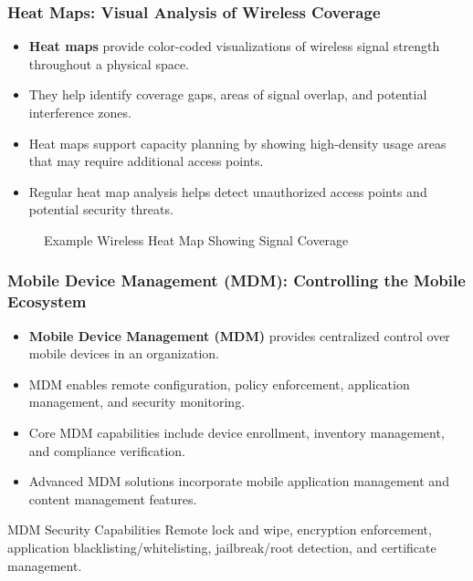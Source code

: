\documentclass{beamer}
\begin{document}
\begin{frame}
    \frametitle{Heat Maps: Visual Analysis of Wireless Coverage}
    
    \begin{itemize}
        \item \textbf{Heat maps} provide color-coded visualizations of wireless signal strength throughout a physical space.
        \item They help identify coverage gaps, areas of signal overlap, and potential interference zones.
        \item Heat maps support capacity planning by showing high-density usage areas that may require additional access points.
        \item Regular heat map analysis helps detect unauthorized access points and potential security threats.
    \end{itemize}
    
    \begin{figure}
        \centering
        \caption{Example Wireless Heat Map Showing Signal Coverage}
    \end{figure}
\end{frame}

\begin{frame}
    \frametitle{Mobile Device Management (MDM): Controlling the Mobile Ecosystem}
    
    \begin{itemize}
        \item \textbf{Mobile Device Management (MDM)} provides centralized control over mobile devices in an organization.
        \item MDM enables remote configuration, policy enforcement, application management, and security monitoring.
        \item Core MDM capabilities include device enrollment, inventory management, and compliance verification.
        \item Advanced MDM solutions incorporate mobile application management and content management features.
    \end{itemize}
    
    \begin{alertblock}{MDM Security Capabilities}
        Remote lock and wipe, encryption enforcement, application blacklisting/whitelisting, jailbreak/root detection, and certificate management.
    \end{alertblock}
\end{frame}
\end{document}
